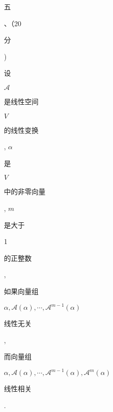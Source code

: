 \documentclass[10pt]{article}
\begin{document}
\begin{CJK}{UTF8}{mj}五\end{CJK}、（20 \begin{CJK}{UTF8}{mj}分\end{CJK}) \begin{CJK}{UTF8}{mj}设\end{CJK} $\mathscr{A}$ \begin{CJK}{UTF8}{mj}是线性空间\end{CJK} $V$ \begin{CJK}{UTF8}{mj}的线性变换\end{CJK}, $\alpha$ \begin{CJK}{UTF8}{mj}是\end{CJK} $V$ \begin{CJK}{UTF8}{mj}中的非零向量\end{CJK}, $m$ \begin{CJK}{UTF8}{mj}是大于\end{CJK} 1 \begin{CJK}{UTF8}{mj}的正整数\end{CJK}, \begin{CJK}{UTF8}{mj}如果向量组\end{CJK} $\alpha, \mathscr{A}(\alpha), \cdots, \mathscr{A}^{m-1}(\alpha)$ \begin{CJK}{UTF8}{mj}线性无关\end{CJK}, \begin{CJK}{UTF8}{mj}而向量组\end{CJK} $\alpha, \mathscr{A}(\alpha), \cdots, \mathscr{A}^{m-1}(\alpha), \mathscr{A}^{m}(\alpha)$ \begin{CJK}{UTF8}{mj}线性相关\end{CJK}.
\end{document}
